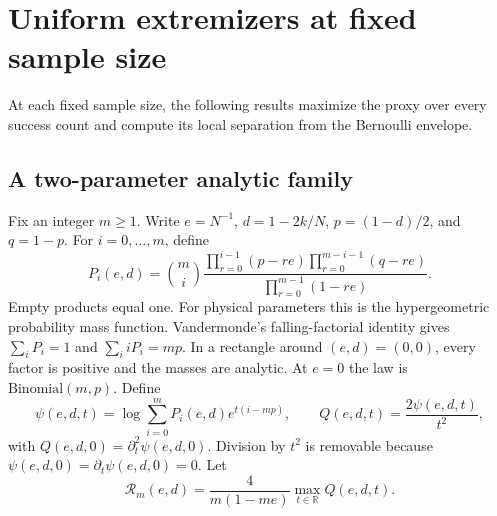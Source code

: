 \section{Uniform extremizers at fixed sample size}\label{sec:uniform_fixed}
At each fixed sample size, the following results maximize the proxy over every success count and compute its local separation from the Bernoulli envelope.

\subsection{A two-parameter analytic family}
Fix an integer $m\ge1$. Write $e=N^{-1}$, $d=1-2k/N$, $p=(1-d)/2$, and $q=1-p$. For $i=0,\ldots,m$, define
\begin{equation}\label{eq:analytic_masses}
 P_i(e,d)=\binom mi
 \frac{\prod_{r=0}^{i-1}(p-re)\prod_{r=0}^{m-i-1}(q-re)}
 {\prod_{r=0}^{m-1}(1-re)}.
\end{equation}
Empty products equal one. For physical parameters this is the hypergeometric probability mass function. Vandermonde's falling-factorial identity gives $\sum_iP_i=1$ and $\sum_i iP_i=mp$. In a rectangle around $(e,d)=(0,0)$, every factor is positive and the masses are analytic. At $e=0$ the law is $\mathrm{Binomial}(m,p)$. Define
\[
 \psi(e,d,t)=\log\sum_{i=0}^mP_i(e,d)e^{t(i-mp)},\qquad
 Q(e,d,t)=\frac{2\psi(e,d,t)}{t^2},
\]
with $Q(e,d,0)=\partial_t^2\psi(e,d,0)$. Division by $t^2$ is removable because $\psi(e,d,0)=\partial_t\psi(e,d,0)=0$. Let
\[
 \mathcal R_m(e,d)=\frac{4}{m(1-me)}\max_{t\in\mathbb R}Q(e,d,t).
\]

